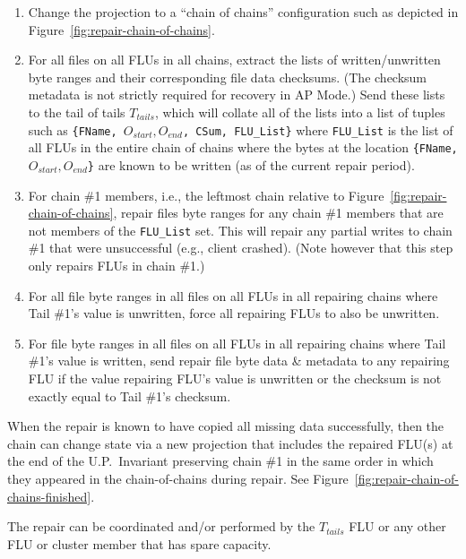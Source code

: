 \documentclass[preprint,10pt]{sigplanconf}
\begin{document}
\begin{enumerate}

\item Change the projection to a ``chain of chains'' configuration
  such as depicted in Figure~\ref{fig:repair-chain-of-chains}.

\item For all files on all FLUs in all chains, extract the lists of
  written/unwritten byte ranges and their corresponding file data
  checksums.  (The checksum metadata is not strictly required for
  recovery in AP Mode.)
  Send these lists to the tail of tails
  $T_{tails}$, which will collate all of the lists into a list of
  tuples such as {\tt \{FName, $O_{start}, O_{end}$, CSum, FLU\_List\}}
  where {\tt FLU\_List} is the list of all FLUs in the entire chain of
  chains where the bytes at the location {\tt \{FName, $O_{start},
    O_{end}$\}} are known to be written (as of the current repair period).

\item For chain \#1 members, i.e., the
  leftmost chain relative to Figure~\ref{fig:repair-chain-of-chains},
  repair files byte ranges for any chain \#1 members that are not members
  of the {\tt FLU\_List} set.  This will repair any partial
  writes to chain \#1 that were unsuccessful (e.g., client crashed).
  (Note however that this step only repairs FLUs in chain \#1.)

\item For all file byte ranges in all files on all FLUs in all
  repairing chains where Tail \#1's value is unwritten, force all
  repairing FLUs to also be unwritten.

\item For file byte ranges in all files on all FLUs in all repairing
  chains where Tail \#1's value is written, send repair file byte data
  \& metadata to any repairing FLU if the value repairing FLU's
  value is unwritten or the checksum is not exactly equal to Tail \#1's
  checksum.

\end{enumerate}

When the repair is known to have copied all missing data successfully,
then the chain can change state via a new projection that includes the
repaired FLU(s) at the end of the U.P.~Invariant preserving chain \#1
in the same order in which they appeared in the chain-of-chains during
repair.  See Figure~\ref{fig:repair-chain-of-chains-finished}.

The repair can be coordinated and/or performed by the $T_{tails}$ FLU
or any other FLU or cluster member that has spare capacity.
\end{document}

